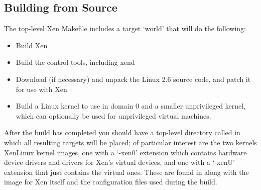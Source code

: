 \documentclass[11pt,twoside,final,openright]{report}
\def\xend{{xend}\xspace}
\begin{document}
%
%

\subsection{Building from Source} 

The top-level Xen Makefile includes a target `world' that will do the
following:

\begin{itemize}
\item Build Xen
\item Build the control tools, including \xend
\item Download (if necessary) and unpack the Linux 2.6 source code,
      and patch it for use with Xen
\item Build a Linux kernel to use in domain 0 and a smaller
      unprivileged kernel, which can optionally be used for
      unprivileged virtual machines.
\end{itemize}


After the build has completed you should have a top-level 
directory called  in which all resulting targets 
will be placed; of particular interest are the two kernels 
XenLinux kernel images, one with a `-xen0' extension
which contains hardware device drivers and drivers for Xen's virtual
devices, and one with a `-xenU' extension that just contains the
virtual ones. These are found in  along
with the image for Xen itself and the configuration files used
during the build. 
\end{document}

